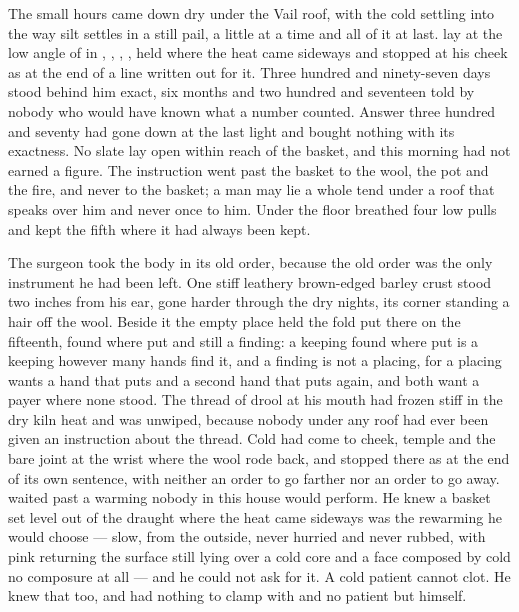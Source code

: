 
The small hours came down dry under the Vail roof, with the cold settling into  the way silt settles in a still pail, a little at a time and all of it at last.  lay at the low angle of  in , , , , held where the heat came sideways and stopped at his cheek as at the end of a line written out for it. Three hundred and ninety-seven days stood behind him exact, six months and two hundred and seventeen told by nobody who would have known what a number counted. Answer three hundred and seventy had gone down at the last light and bought nothing with its exactness. No slate lay open within reach of the basket, and this morning had not earned a figure. The instruction went past the basket to the wool, the pot and the fire, and never to the basket; a man may lie a whole tend under a roof that speaks over him and never once to him. Under the floor  breathed four low pulls and kept the fifth where it had always been kept.

The surgeon took the body in its old order, because the old order was the only instrument he had been left. One stiff leathery brown-edged barley crust stood two inches from his ear, gone harder through the dry nights, its corner standing a hair off the wool. Beside it the empty place held the fold put there on the fifteenth, found where put and still a finding: a keeping found where put is a keeping however many hands find it, and a finding is not a placing, for a placing wants a hand that puts and a second hand that puts again, and both want a payer where none stood. The thread of drool at his mouth had frozen stiff in the dry kiln heat and was unwiped, because nobody under any roof had ever been given an instruction about the thread. Cold had come to cheek, temple and the bare joint at the wrist where the wool rode back, and stopped there as at the end of its own sentence, with neither an order to go farther nor an order to go away.  waited past a warming nobody in this house would perform. He knew a basket set level out of the draught where the heat came sideways was the rewarming he would choose — slow, from the outside, never hurried and never rubbed, with pink returning the surface still lying over a cold core and a face composed by cold no composure at all — and he could not ask for it. A cold patient cannot clot. He knew that too, and had nothing to clamp with and no patient but himself.

